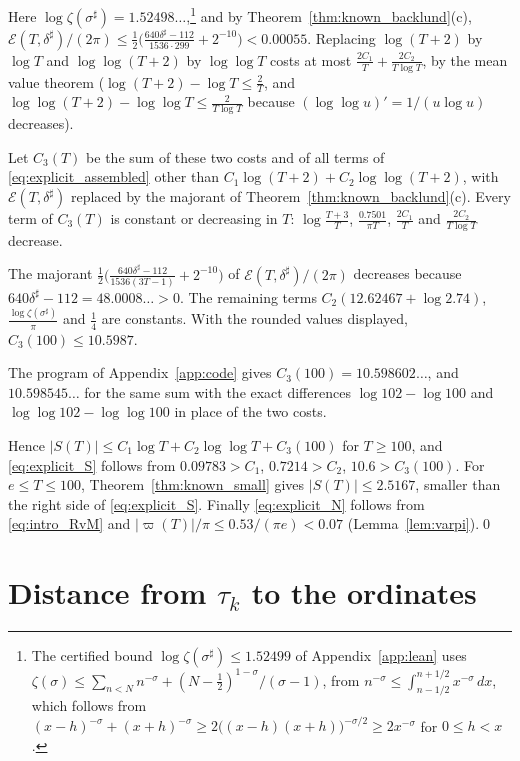 \documentclass[11pt,a4paper]{article}
\makeatletter
\numberwithin{equation}{section}
\DeclareRobustCommand{\CGref}[1]{\ref{#1}}
\DeclareRobustCommand{\CGeqref}[1]{\eqref{#1}}
\let\CG@origref\ref
\let\CG@origeqref\eqref
\newcommand{\CG@gettip}[1]{\@ifundefined{CGTip@#1}{#1}{\csname CGTip@#1\endcsname}}
\DeclareRobustCommand{\CGref}[1]{\pdftooltip{\CG@origref{#1}}{\CG@gettip{#1}}}
\DeclareRobustCommand{\CGeqref}[1]{\pdftooltip{\CG@origeqref{#1}}{\CG@gettip{#1}}}
\theoremstyle{definition}
\theoremstyle{remark}
\makeatother
\begin{document}
Here $\log\zeta(\sigma^\sharp)=1.52498\ldots$,\footnote{The certified bound $\log\zeta(\sigma^\sharp)\le1.52499$ of Appendix~\CGref{app:lean} uses $\zeta(\sigma)\le\sum_{n<N}n^{-\sigma}+(N-\frac12)^{1-\sigma}/(\sigma-1)$, from $n^{-\sigma}\le\int_{n-1/2}^{n+1/2}x^{-\sigma}\,dx$, which follows from $(x-h)^{-\sigma}+(x+h)^{-\sigma}\ge2\bigl((x-h)(x+h)\bigr)^{-\sigma/2}\ge2x^{-\sigma}$ for $0\le h<x$.} and by Theorem~\CGref{thm:known_backlund}(c), $\mathcal E(T,\delta^\sharp)/(2\pi)\le\frac12\bigl(\frac{640\delta^\sharp-112}{1536\cdot299}+2^{-10}\bigr)<0.00055$. Replacing $\log(T+2)$ by $\log T$ and $\log\log(T+2)$ by $\log\log T$ costs at most $\frac{2C_1}T+\frac{2C_2}{T\log T}$, by the mean value theorem ($\log(T+2)-\log T\le\frac2T$, and $\log\log(T+2)-\log\log T\le\frac2{T\log T}$ because $(\log\log u)'=1/(u\log u)$ decreases).

Let $C_3(T)$ be the sum of these two costs and of all terms of \CGeqref{eq:explicit_assembled} other than $C_1\log(T+2)+C_2\log\log(T+2)$, with $\mathcal E(T,\delta^\sharp)$ replaced by the majorant of Theorem~\CGref{thm:known_backlund}(c). Every term of $C_3(T)$ is constant or decreasing in $T$: $\log\frac{T+3}T$, $\frac{0.7501}{\pi T}$, $\frac{2C_1}T$ and $\frac{2C_2}{T\log T}$ decrease.

The majorant $\frac12\bigl(\frac{640\delta^\sharp-112}{1536(3T-1)}+2^{-10}\bigr)$ of $\mathcal E(T,\delta^\sharp)/(2\pi)$ decreases because $640\delta^\sharp-112=48.0008\ldots>0$. The remaining terms $C_2(12.62467+\log2.74)$, $\frac{\log\zeta(\sigma^\sharp)}\pi$ and $\frac14$ are constants. With the rounded values displayed, $C_3(100)\le10.5987$.

The program of Appendix~\CGref{app:code} gives $C_3(100)=10.598602\ldots$, and $10.598545\ldots$ for the same sum with the exact differences $\log102-\log100$ and $\log\log102-\log\log100$ in place of the two costs.

Hence $|S(T)|\le C_1\log T+C_2\log\log T+C_3(100)$ for $T\ge100$, and \CGeqref{eq:explicit_S} follows from $0.09783>C_1$, $0.7214>C_2$, $10.6>C_3(100)$. For $e\le T\le100$, Theorem~\CGref{thm:known_small} gives $|S(T)|\le2.5167$, smaller than the right side of \CGeqref{eq:explicit_S}. Finally \CGeqref{eq:explicit_N} follows from \CGeqref{eq:intro_RvM} and $|\varpi(T)|/\pi\le0.53/(\pi e)<0.07$ (Lemma~\CGref{lem:varpi}).\qed

\section{Distance from \texorpdfstring{$\tau_k$}{tau_k} to the ordinates}\label{sec:clock}
\end{document}

